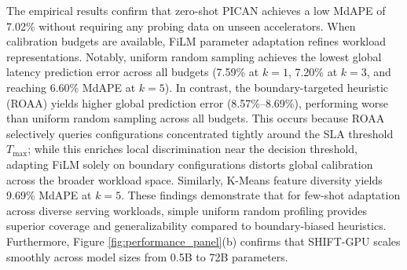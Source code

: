 \documentclass[preprint,12pt]{elsarticle}
\begin{document}
\begin{table}[h]
\centering
\caption{Few-shot profiling adaptation benchmark on unseen accelerators across measurement budgets ($k$) and acquisition policies. Evaluated strictly on untouched test samples ($D_{\text{test}} \setminus D_{\text{probe}}$).}
\label{tab:few_shot_results}
\end{table}

The empirical results confirm that zero-shot PICAN achieves a low MdAPE of 7.02\% without requiring any probing data on unseen accelerators. When calibration budgets are available, FiLM parameter adaptation refines workload representations. Notably, uniform random sampling achieves the lowest global latency prediction error across all budgets (7.59\% at $k=1$, 7.20\% at $k=3$, and reaching 6.60\% MdAPE at $k=5$). In contrast, the boundary-targeted heuristic (ROAA) yields higher global prediction error (8.57\%--8.69\%), performing worse than uniform random sampling across all budgets. This occurs because ROAA selectively queries configurations concentrated tightly around the SLA threshold $T_{\max}$; while this enriches local discrimination near the decision threshold, adapting FiLM solely on boundary configurations distorts global calibration across the broader workload space. Similarly, K-Means feature diversity yields 9.69\% MdAPE at $k=5$. These findings demonstrate that for few-shot adaptation across diverse serving workloads, simple uniform random profiling provides superior coverage and generalizability compared to boundary-biased heuristics. Furthermore, Figure \ref{fig:performance_panel}(b) confirms that SHIFT-GPU scales smoothly across model sizes from 0.5B to 72B parameters.
\end{document}
